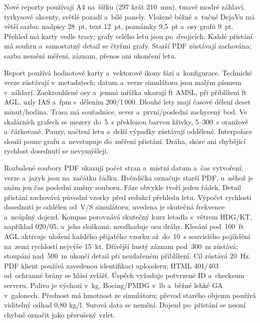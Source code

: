 \documentclass[11pt,a4paper]{article}
\begin{document}
Nové reporty používají A4 na~šířku (297 krát 210~mm), tmavě modré záhlaví,
tyrkysové akcenty, světlé pozadí a~bílé panely. Vložené běžné a~tučné DejaVu
má větší sazbu: nadpisy 28~pt, text 12~pt, poznámky 9,5~pt a~osy grafů 9~pt.
Přehled má karty vedle trasy; grafy celého letu jsou po~dvojicích. Každé
přistání má souhrn a~samostatný detail se čtyřmi grafy. Starší PDF zůstávají
zachována; sazba nemění měření, záznam, přenos ani ukončení letu.

Report používá hodnotové karty a~vektorové ikony fází a~konfigurace. Technické
verze zůstávají v~metadatech; datum a~verze simulátoru jsou malým písmem
v~záhlaví. Zaokrouhlené osy a~jemná mřížka ukazují ft AMSL, při přiblížení
ft AGL, uzly IAS a~fpm s~dělením 200/1\,000. Dlouhé lety mají časové dělení
deset minut/hodina. Trasa má souřadnice, sever a~první/poslední zachycený bod.
Ve skalárních grafech se mezery do~5~s překlenou barvou křivky, 5--300~s
oranžově a~čárkovaně. Pauzy, načtení letu a~delší výpadky zůstávají oddělené.
Interpolace slouží pouze grafu a~nevstupuje do~měření přistání. Dráha, skóre
ani chybějící rychlost dosednutí se nevymýšlejí.

Rozbalené soubory PDF ukazují počet stran a~místní datum a~čas vytvoření;
verze a~jazyk jsou na~začátku řádku. Hvězdička označuje starší PDF, u~něhož
je znám jen čas poslední změny souboru. Fáze obvykle tvoří jeden řádek.
Detail přistání zachovává původní vzorky před redukcí přehledu letu. Výpočet
rychlosti dosednutí je oddělen od~V/S simulátoru; uvedena je skutečná frekvence
a~neúplný dojezd. Kompas porovnává skutečný kurz letadla s~větrem HDG/KT,
například 020/05, a~jeho složkami; neodhaduje osu dráhy. Klesání pod~100~ft
AGL aktivuje uložení každého přijatého vzorku až~do~10~s souvislého pojíždění
na~zemi rychlostí nejvýše 15~kt. Dřívější hustý záznam pod~300~m zůstává;
stoupání nad~500~m ukončí detail při nezdařeném přiblížení. Cíl zůstává 20~Hz.
PDF klient používá zavedenou identifikaci uploaderu; HTML 401/403 od~ochranné
brány se hlásí zvlášť. Úspěch vyžaduje potvrzené ID a~checksum serveru. Palivo
je výchozí v~kg, Boeing/PMDG v~lb a~běžné lehké GA
v~galonech. Přednost má hmotnost ze simulátoru; převod starého objemu používá
viditelný odhad 0,80 kg/l. Surová data se nemění. Dojezd po~přistání se
nesmí chybně označit jako přerušený vzlet.
\end{document}
